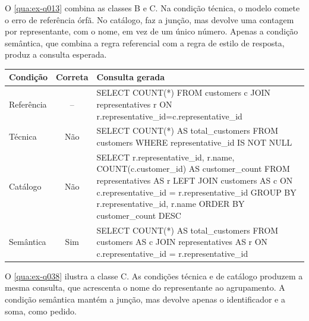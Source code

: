 O \autoref{qua:ex-q013} combina as classes B e C. Na condição técnica, o
modelo comete o erro de referência órfã. No catálogo, faz a junção, mas
devolve uma contagem por representante, com o nome, em vez de um único
número. Apenas a condição semântica, que combina a regra referencial com a
regra de estilo de resposta, produz a consulta esperada.

\begin{quadro}[htb]
  \centering
  \caption{Q013: ``Quantos clientes estão associados a um representante?''}
  \label{qua:ex-q013}
  \footnotesize
  \begin{tabularx}{\textwidth}{|l|c|X|}
    \hline
    \textbf{Condição} & \textbf{Correta} & \textbf{Consulta gerada} \\ \hline
    Referência & -- & \ttfamily SELECT COUNT(*) FROM customers c JOIN
      representatives r ON r.representative\_id=c.representative\_id \\ \hline
    Técnica & Não & \ttfamily SELECT COUNT(*) AS total\_customers FROM
      customers WHERE representative\_id IS NOT NULL \\ \hline
    Catálogo & Não & \ttfamily SELECT r.representative\_id, r.name,
      COUNT(c.customer\_id) AS customer\_count FROM representatives AS r LEFT
      JOIN customers AS c ON c.representative\_id = r.representative\_id
      GROUP BY r.representative\_id, r.name ORDER BY customer\_count DESC \\ \hline
    Semântica & Sim & \ttfamily SELECT COUNT(*) AS total\_customers FROM
      customers AS c JOIN representatives AS r ON c.representative\_id =
      r.representative\_id \\ \hline
  \end{tabularx}
\end{quadro}

O \autoref{qua:ex-q038} ilustra a classe C. As condições técnica e de
catálogo produzem a mesma consulta, que acrescenta o nome do representante
ao agrupamento. A condição semântica mantém a junção, mas devolve apenas o
identificador e a soma, como pedido.

